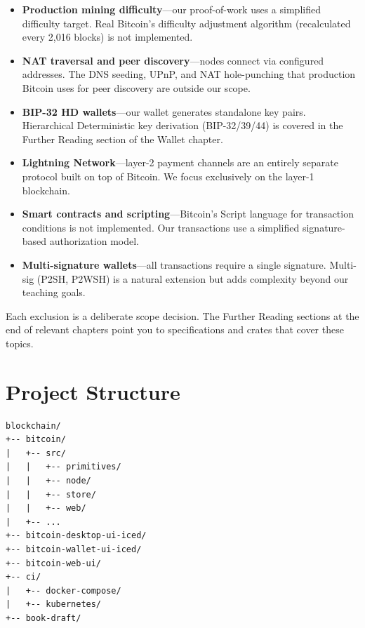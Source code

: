 \begin{itemize}
  \item[\textbf{---}] \textbf{Production mining difficulty}---our proof-of-work uses a simplified difficulty target. Real Bitcoin's difficulty adjustment algorithm (recalculated every 2,016 blocks) is not implemented.
  \item[\textbf{---}] \textbf{NAT traversal and peer discovery}---nodes connect via configured addresses. The DNS seeding, UPnP, and NAT hole-punching that production Bitcoin uses for peer discovery are outside our scope.
  \item[\textbf{---}] \textbf{BIP-32 HD wallets}---our wallet generates standalone key pairs. Hierarchical Deterministic key derivation (BIP-32/39/44) is covered in the Further Reading section of the Wallet chapter.
  \item[\textbf{---}] \textbf{Lightning Network}---layer-2 payment channels are an entirely separate protocol built on top of Bitcoin. We focus exclusively on the layer-1 blockchain.
  \item[\textbf{---}] \textbf{Smart contracts and scripting}---Bitcoin's Script language for transaction conditions is not implemented. Our transactions use a simplified signature-based authorization model.
  \item[\textbf{---}] \textbf{Multi-signature wallets}---all transactions require a single signature. Multi-sig (P2SH, P2WSH) is a natural extension but adds complexity beyond our teaching goals.
\end{itemize}

Each exclusion is a deliberate scope decision. The Further Reading sections at the end of relevant chapters point you to specifications and crates that cover these topics.

\clearpage
\section{Project Structure}
\label{sec:project-structure}

\begin{verbatim}
blockchain/
+-- bitcoin/
|   +-- src/
|   |   +-- primitives/
|   |   +-- node/
|   |   +-- store/
|   |   +-- web/
|   +-- ...
+-- bitcoin-desktop-ui-iced/
+-- bitcoin-wallet-ui-iced/
+-- bitcoin-web-ui/
+-- ci/
|   +-- docker-compose/
|   +-- kubernetes/
+-- book-draft/
\end{verbatim}

